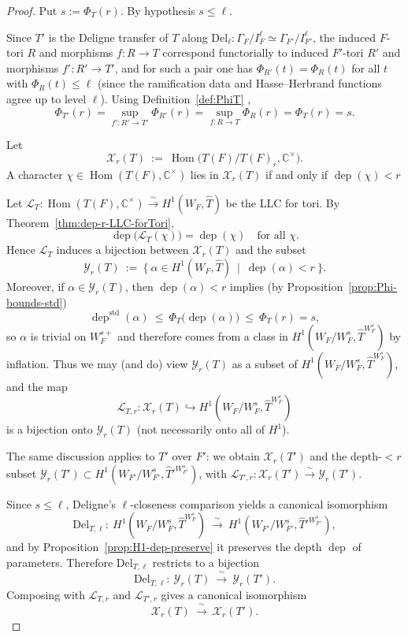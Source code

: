 \documentclass[american]{article}
\numberwithin{equation}{section}
\numberwithin{figure}{section}
\theoremstyle{plain}
\theoremstyle{definition}
\theoremstyle{remark}
\DeclareMathOperator{\Hom}{Hom}
\DeclareMathOperator{\dep}{dep}
\DeclareMathOperator{\std}{std}
\newcommand{\Del}{\mathrm{Del}}
\newcommand{\C}{\mathbb{C}}
\begin{document}
\begin{proof}
Put \(s:=\Phi_T(r)\). By hypothesis \(s\le \ell\).

\medskip\noindent
Since \(T'\) is the Deligne transfer of \(T\) along \(\Del_\ell:\Gamma_F/I_F^\ell\simeq \Gamma_{F'}/I_{F'}^\ell\),
the induced \(F\)-tori \(R\) and morphisms \(f:R\to T\) correspond
functorially to induced \(F'\)-tori \(R'\) and morphisms \(f':R'\to T'\), and for such a pair one has
\(\Phi_{R'}(t)=\Phi_R(t)\) for all \(t\) with \(\Phi_R(t)\le \ell\) (since the ramification data and Hasse--Herbrand
functions agree up to level \(\ell\)).
Using Definition~\ref{def:PhiT} ,
\[
\Phi_{T'}(r)
=\sup_{f':R'\to T'}\Phi_{R'}(r)
=\sup_{f:R\to T}\Phi_R(r)
=\Phi_T(r)
=s.
\]

\medskip\noindent
Let
\[
\mathscr X_r(T)\ :=\ \Hom\!\bigl(T(F)/T(F)_r,\C^\times\bigr).
\]
A character \(\chi\in\Hom(T(F),\C^\times)\) lies in \(\mathscr X_r(T)\) if and only if \(\dep(\chi)<r\)

Let \(\mathcal L_T:\Hom(T(F),\C^\times)\xrightarrow{\sim} H^1(W_F,\widehat T)\) be the LLC for tori.
By Theorem~\ref{thm:dep-r-LLC-forTori},
\[
\dep\bigl(\mathcal L_T(\chi)\bigr)=\dep(\chi)\quad \text{for all }\chi.
\]
Hence \(\mathcal L_T\) induces a bijection between \(\mathscr X_r(T)\) and the subset
\[
\mathscr Y_r(T)\ :=\ \{\ \alpha\in H^1(W_F,\widehat T)\ \mid\ \dep(\alpha)<r\ \}.
\]
Moreover, if \(\alpha\in \mathscr Y_r(T)\), then \(\dep(\alpha)<r\) implies (by Proposition~\ref{prop:Phi-bounds-std})
\[
\dep^{\std}(\alpha)\ \le\ \Phi_T\!\bigl(\dep(\alpha)\bigr)\ \le\ \Phi_T(r)=s,
\]
so \(\alpha\) is trivial on \(W_F^{s+}\) and therefore comes from a class in
\(H^1(W_F/W_F^{s},\widehat T^{W_F^{s}})\) by inflation. Thus we may (and do) view
\(\mathscr Y_r(T)\) as a subset of \(H^1(W_F/W_F^{s},\widehat T^{W_F^{s}})\), and the map
\[
\mathcal L_{T,r}:\mathscr X_r(T)\hookrightarrow H^1(W_F/W_F^{s},\widehat T^{W_F^{s}})
\]
is a bijection onto \(\mathscr Y_r(T)\) (not necessarily onto all of \(H^1\)).

The same discussion applies to \(T'\) over \(F'\): we obtain \(\mathscr X_r(T')\) and the depth-\(<r\)
subset \(\mathscr Y_r(T')\subset H^1(W_{F'}/W_{F'}^{s},\widehat T'^{W_{F'}^{s}})\), with
\(\mathcal L_{T',r}:\mathscr X_r(T')\xrightarrow{\sim}\mathscr Y_r(T')\).

\medskip\noindent
Since \(s\le \ell\), Deligne's \(\ell\)-closeness comparison yields a canonical isomorphism
\[
\Del_{T,\ell}:\ H^1(W_F/W_F^{s},\widehat T^{W_F^{s}})
\ \xrightarrow{\ \sim\ }\
H^1(W_{F'}/W_{F'}^{s},\widehat T'^{W_{F'}^{s}}),
\]
and by Proposition~\ref{prop:H1-dep-preserve} it preserves the depth \(\dep\) of parameters. Therefore
\(\Del_{T,\ell}\) restricts to a bijection
\[
\Del_{T,\ell}:\ \mathscr Y_r(T)\ \xrightarrow{\ \sim\ }\ \mathscr Y_r(T').
\]
Composing with \(\mathcal L_{T,r}\) and \(\mathcal L_{T',r}\) gives a canonical isomorphism
\[
\mathscr X_r(T)\ \xrightarrow{\ \sim\ }\ \mathscr X_r(T').
\]


\end{proof}
\end{document}
